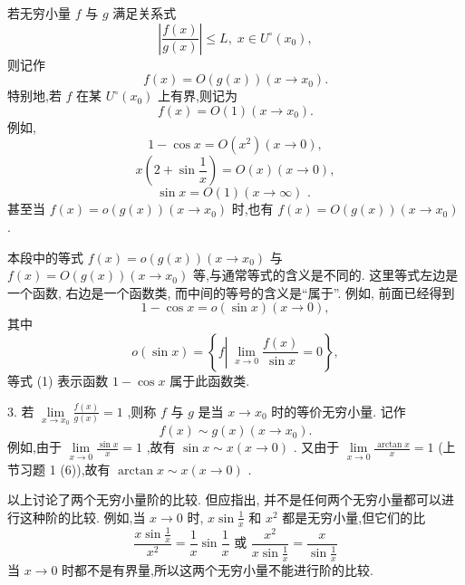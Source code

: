 若无穷小量 \(f\) 与 \(g\) 满足关系式
\[
\left| \frac{f\left( x\right) }{g\left( x\right) }\right|  \leq  L,\;x \in  {U}^{ \circ  }\left( {x}_{0}\right) ,
\]
则记作
\[
f\left( x\right)  = O\left( {g\left( x\right) }\right) \left( {x \rightarrow  {x}_{0}}\right) .
\]
特别地,若 \(f\) 在某 \({U}^{ \circ  }\left( {x}_{0}\right)\) 上有界,则记为
\[
f\left( x\right)  = O\left( 1\right) \left( {x \rightarrow  {x}_{0}}\right) .
\]
例如,
\[
1 - \cos x = O\left( {x}^{2}\right) \left( {x \rightarrow  0}\right) ,
\]
\[
x\left( {2 + \sin \frac{1}{x}}\right)  = O\left( x\right) \left( {x \rightarrow  0}\right) ,
\]
\[
\sin x = O\left( 1\right) \left( {x \rightarrow  \infty }\right) \text{ . }
\]
甚至当 \(f\left( x\right)  = o\left( {g\left( x\right) }\right) \left( {x \rightarrow  {x}_{0}}\right)\) 时,也有 \(f\left( x\right)  = O\left( {g\left( x\right) }\right) \left( {x \rightarrow  {x}_{0}}\right)\) .

\begin{remark}
本段中的等式 \(f\left( x\right)  = o\left( {g\left( x\right) }\right) \left( {x \rightarrow  {x}_{0}}\right)\) 与 \(f\left( x\right)  = O\left( {g\left( x\right) }\right) \left( {x \rightarrow  {x}_{0}}\right)\) 等,与通常等式的含义是不同的. 这里等式左边是一个函数, 右边是一个函数类, 而中间的等号的含义是“属于”. 例如, 前面已经得到
\[
1 - \cos x = o\left( {\sin x}\right) \left( {x \rightarrow  0}\right) , \tag{1}
\]
其中
\[
o\left( {\sin x}\right)  = \left\{  {f\left| {\;\mathop{\lim }\limits_{{x \rightarrow  0}}\frac{f\left( x\right) }{\sin x} = 0}\right. }\right\}  ,
\]
等式 (1) 表示函数 \(1 - \cos x\) 属于此函数类.
\end{remark}


3. 若 \(\mathop{\lim }\limits_{{x \rightarrow  {x}_{0}}}\frac{f\left( x\right) }{g\left( x\right) } = 1\) ,则称 \(f\) 与 \(g\) 是当 \(x \rightarrow  {x}_{0}\) 时的等价无穷小量. 记作
\[
f\left( x\right)  \sim  g\left( x\right) \left( {x \rightarrow  {x}_{0}}\right) .
\]
例如,由于 \(\mathop{\lim }\limits_{{x \rightarrow  0}}\frac{\sin x}{x} = 1\) ,故有 \(\sin x \sim  x\left( {x \rightarrow  0}\right)\) . 又由于 \(\mathop{\lim }\limits_{{x \rightarrow  0}}\frac{\arctan x}{x} = 1\) (上节习题 1 (6)),故有 \(\arctan x \sim  x\left( {x \rightarrow  0}\right)\) .

以上讨论了两个无穷小量阶的比较. 但应指出, 并不是任何两个无穷小量都可以进行这种阶的比较. 例如,当 \(x \rightarrow  0\) 时, \(x\sin \frac{1}{x}\) 和 \({x}^{2}\) 都是无穷小量,但它们的比
\[
\frac{x\sin \frac{1}{x}}{{x}^{2}} = \frac{1}{x}\sin \frac{1}{x}\text{ 或 }\frac{{x}^{2}}{x\sin \frac{1}{x}} = \frac{x}{\sin \frac{1}{x}}
\]
当 \(x \rightarrow  0\) 时都不是有界量,所以这两个无穷小量不能进行阶的比较.

